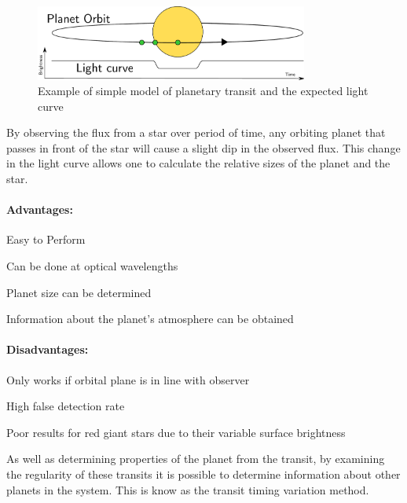 \begin{figure}[ht]
    \centering
    \includegraphics[width=0.8\textwidth]{images/planetary_transit.pdf}
    \caption{Example of simple model of planetary transit and the expected light curve}
    \label{fig:transit}
\end{figure}

By observing the flux from a star over period of time, any orbiting planet that passes in front of the star will cause a slight dip in the observed flux. This change in the light curve allows one to calculate the relative sizes of the planet and the star.

\paragraph{Advantages:}
\begin{itemize*}
    \item Easy to Perform
    \item Can be done at optical wavelengths
    \item Planet size can be determined
    \item Information about the planet's atmosphere can be obtained \citep{fortney2006atmosphere}
\end{itemize*}

\paragraph{Disadvantages:}
\begin{itemize*}
    \item Only works if orbital plane is in line with observer
    \item High false detection rate \citep{santerne2012sophie}
    \item Poor results for red giant stars due to their variable surface brightness
\end{itemize*}

As well as determining properties of the planet from the transit, by examining the regularity of these transits it is possible to determine information about other planets in the system. This is know as the transit timing variation method.

